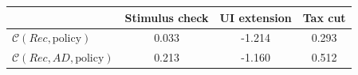 \begin{tabular}{@{}lccc@{}} 
\toprule 
                          & Stimulus check      & UI extension    & Tax cut    \\  \midrule 
$\mathcal{C}(Rec,\text{policy})$ & 0.033  & -1.214  & 0.293     \\ 
$\mathcal{C}(Rec, AD,\text{policy})$ & 0.213  & -1.160  & 0.512     \\ 
\end{tabular}  
